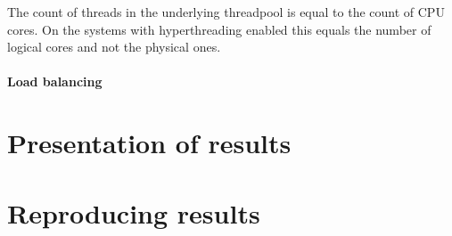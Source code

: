 
The count of threads in the underlying threadpool is equal to the count of CPU cores. On the systems with hyperthreading enabled this equals the number of logical cores and not the physical ones. 

\paragraph*{Load balancing}









\section{Presentation of results}

\section{Reproducing results}
